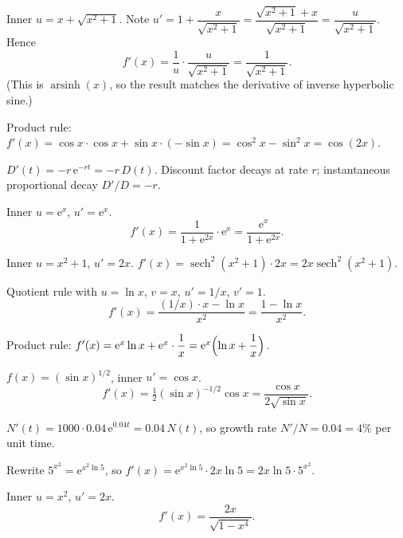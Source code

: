 \begin{solutions}
  \item Inner $u=x+\sqrt{x^{2}+1}$. Note $u'=1+\dfrac{x}{\sqrt{x^{2}+1}}
        =\dfrac{\sqrt{x^{2}+1}+x}{\sqrt{x^{2}+1}}=\dfrac{u}{\sqrt{x^{2}+1}}$.
        Hence
        \[
          f'(x)=\frac{1}{u}\cdot\frac{u}{\sqrt{x^{2}+1}}=\frac{1}{\sqrt{x^{2}+1}} .
        \]
        (This is $\operatorname{arsinh}(x)$, so the result matches the
        derivative of inverse hyperbolic sine.)

  \item Product rule: $f'(x)=\cos x\cdot\cos x+\sin x\cdot(-\sin x)
        =\cos^{2}x-\sin^{2}x=\cos(2x)$.

  \item $D'(t)=-r\,\mathrm{e}^{-rt}=-r\,D(t)$. Discount factor decays at
        rate $r$; instantaneous proportional decay $D'/D=-r$.

  \item Inner $u=\mathrm{e}^{x}$, $u'=\mathrm{e}^{x}$.
        \[
          f'(x)=\frac{1}{1+\mathrm{e}^{2x}}\cdot\mathrm{e}^{x}
               =\frac{\mathrm{e}^{x}}{1+\mathrm{e}^{2x}} .
        \]

  \item Inner $u=x^{2}+1$, $u'=2x$. $f'(x)=\operatorname{sech}^{2}(x^{2}+1)
        \cdot 2x=2x\operatorname{sech}^{2}(x^{2}+1)$.

  \item Quotient rule with $u=\ln x$, $v=x$, $u'=1/x$, $v'=1$.
        \[
          f'(x)=\frac{(1/x)\cdot x-\ln x}{x^{2}}=\frac{1-\ln x}{x^{2}} .
        \]

  \item Product rule: $f'(x)=\mathrm{e}^{x}\ln x+\mathrm{e}^{x}\cdot\dfrac{1}{x}
        =\mathrm{e}^{x}\Bigl(\ln x+\dfrac{1}{x}\Bigr)$.

  \item $f(x)=(\sin x)^{1/2}$, inner $u'=\cos x$.
        \[
          f'(x)=\tfrac12(\sin x)^{-1/2}\cos x=\frac{\cos x}{2\sqrt{\sin x}} .
        \]

  \item $N'(t)=1000\cdot 0.04\,\mathrm{e}^{0.04t}=0.04\,N(t)$, so growth
        rate $N'/N=0.04=4\%$ per unit time.

  \item Rewrite $5^{x^{2}}=\mathrm{e}^{x^{2}\ln 5}$, so
        $f'(x)=\mathrm{e}^{x^{2}\ln 5}\cdot 2x\ln 5=2x\ln 5\cdot 5^{x^{2}}$.

  \item Inner $u=x^{2}$, $u'=2x$.
        \[
          f'(x)=\frac{2x}{\sqrt{1-x^{4}}} .
        \]


\end{solutions}
